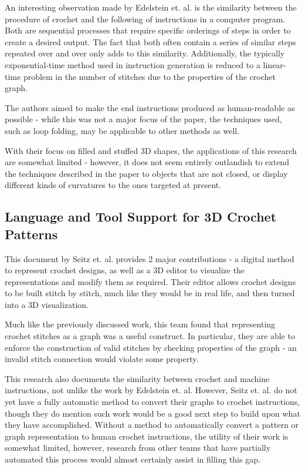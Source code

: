 \documentclass{IEEEcsmag}
\begin{document}
An interesting observation made by Edelstein et. al. is the similarity between
the procedure of crochet and the following of instructions in a computer
program. Both are sequential processes that require specific orderings of steps
in order to create a desired output. The fact that both often contain a series
of similar steps repeated over and over only adds to this similarity.
Additionally, the typically exponential-time method used in instruction
generation is reduced to a linear-time problem in the number of stitches due to
the properties of the crochet graph.

The authors aimed to make the end instructions produced as human-readable as
possible - while this was not a major focus of the paper, the techniques used,
such as loop folding, may be applicable to other methods as well.

With their focus on filled and stuffed 3D shapes, the applications of this
research are somewhat limited - however, it does not seem entirely outlandish
to extend the techniques described in the paper to objects that are not closed,
or display different kinds of curvatures to the ones targeted at present.

\subsection{Language and Tool Support for 3D Crochet Patterns}

This document by Seitz et. al. provides 2 major contributions - a digital
method to represent crochet designs, as well as a 3D editor to visualize the
representations and modify them as required. Their editor allows crochet
designs to be built stitch by stitch, much like they would be in real life, and
then turned into a 3D visualization.

Much like the previously discussed work, this team found that representing
crochet stitches as a graph was a useful construct. In particular, they are
able to enforce the construction of valid stitches by checking properties of
the graph - an invalid stitch connection would violate some property.

This research also documents the similarity between crochet and machine
instructions, not unlike the work by Edelstein et. al. However, Seitz et. al.
do not yet have a fully automatic method to convert their graphs to crochet
instructions, though they do mention such work would be a good next step to
build upon what they have accomplished. Without a method to automatically
convert a pattern or graph representation to human crochet instructions, the
utility of their work is somewhat limited, however, research from other teams
that have partially automated this process would almost certainly assist in
filling this gap.
\end{document}
